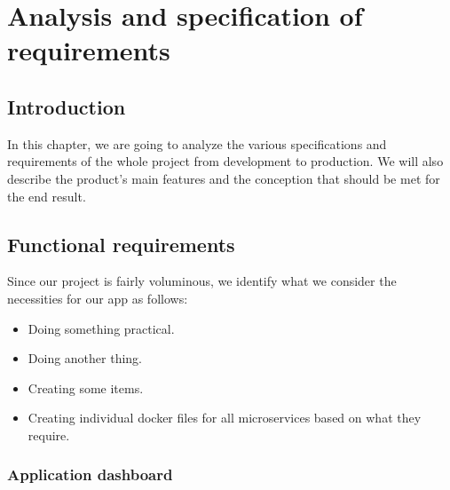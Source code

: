 \chapter{Analysis and specification of requirements}
\minitoc
\newpage

\setcounter{secnumdepth}{0} %
\section{Introduction}
In this chapter, we are going to analyze the various specifications and requirements of the whole project from development to production.
We will also describe the product's main features and the conception that should be met for the end result.

\setcounter{secnumdepth}{2} %
\section{Functional requirements}
Since our project is fairly voluminous, we identify what we consider the necessities for our app as follows:
\begin{itemize}
    \item Doing something practical.
    \item Doing another thing.
    \item Creating some items.
    \item Creating individual docker files for all microservices based on what they require.
\end{itemize}

\subsection{Application dashboard}

